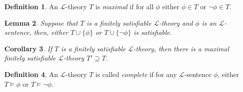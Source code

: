 \documentclass{amsart}
\newtheorem{theorem}{Theorem}[subsection]
\newtheorem{lemma}[theorem]{Lemma}
\newtheorem{corollary}[theorem]{Corollary}
\theoremstyle{definition}
\newtheorem{definition}[theorem]{Definition}
\numberwithin{equation}{section}
\begin{document}
\begin{definition}
  An $\mathcal{L}$-theory $T$ is \emph{maximal} if for all $\phi$ either $\phi \in T$ or $\neg \phi \in T$.
\end{definition}



\begin{lemma}
  Suppose that $T$ is a finitely satisfiable $\mathcal{L}$-theory and $\phi$ is an $\mathcal{L}$-sentence, then,
  either $T \cup \{\phi\}$ or $T \cup \{\neg\phi\}$ is satisfiable.
\end{lemma}

\begin{corollary}
  If $T$ is a finitely satisfiable $\mathcal{L}$-theory,
  then there is a maximal finitely satisfiable $\mathcal{L}$-theory $T' \supseteq T$.
\end{corollary}



\begin{definition}
  An $\mathcal{L}$-theory $T$ is called \emph{complete} if for any $\mathcal{L}$-sentence $\phi$,
  either $T \models \phi$ or $T \models \neg\phi$.
\end{definition}
\end{document}
